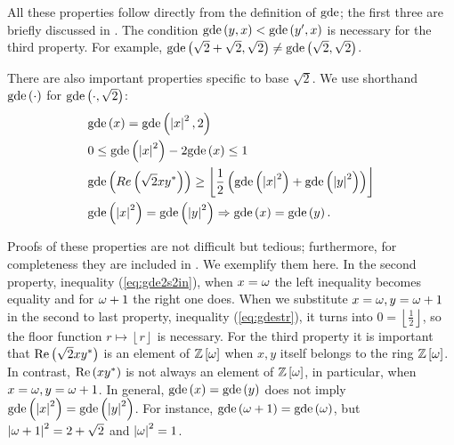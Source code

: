 \documentclass[english,journal]{extarticle}
\theoremstyle{plain}
\theoremstyle{plain}
\theoremstyle{plain}
\theoremstyle{definition}
\theoremstyle{plain}
\theoremstyle{plain}
\begin{document}
All these properties follow directly from the definition of $\mathbf{\mathrm{gde}}$;
the first three are briefly discussed in . The
condition
$\mathbf{\mathrm{gde}}\left(y,x\right)<\mathbf{\mathrm{gde}}\left(y',x\right)$ is necessary for the
third property. For example,
$\mathbf{\mathrm{gde}}\left(\sqrt{2}+\sqrt{2},\sqrt{2}\right)\ne\mathbf{\mathrm{gde}}\left(\sqrt{2},\sqrt{2}
\right)$. 

There are also important properties specific to base $\sqrt{2}$.
We use shorthand $\mathbf{\mathrm{gde}}\left(\cdot\right)$ for
$\mathbf{\mathrm{gde}}\left(\cdot,\sqrt{2}\right)$:
\begin{alignat}{1}
 & \mathbf{\mathrm{gde}}\left(x\right)=\mathbf{\mathrm{gde}}\left(\left|x\right|^{2},2\right)\label{eq:gde2s2}\\
 & 0\le\mathbf{\mathrm{gde}}\left(\left|x\right|^{2}\right)-2\mathbf{\mathrm{gde}}\left(x\right)\le 1\label{eq:gde2s2in}\\
 & \mathbf{\mathrm{gde}}\left(Re\left(\sqrt{2}xy^{*}\right)\right)\ge\left\lfloor
\frac{1}{2}\left(\mathbf{\mathrm{gde}}\left(\left|x\right|^{2}\right)+\mathbf{\mathrm{gde}}\left(\left|y\right|^{2}\right)\right)\right\rfloor \label{eq:gdestr}\\
 & \mathbf{\mathrm{gde}}\left(\left|x\right|^{2}\right)=\mathbf{\mathrm{gde}}\left(\left|y\right|^{2}\right)\Rightarrow\mathbf{\mathrm{gde}}\left(x\right)=\mathbf{\mathrm{gde}}\left(y\right)\label{eq:reduction}.
\end{alignat}

Proofs of these properties are not difficult but tedious; furthermore, for completeness they are included
in . We exemplify them here. In the second property,
inequality (\ref{eq:gde2s2in}), when $x=\omega$ the left inequality becomes
equality and for $\omega+1$ the right one does.  When we substitute $x=\omega,y=\omega+1$
in the second to last property, inequality (\ref{eq:gdestr}), it turns into $0=\left\lfloor
\frac{1}{2}\right\rfloor $,
so the floor function $r\mapsto\left\lfloor r\right\rfloor $
is necessary. For the third property it is important that
$\mathrm{Re}\left(\sqrt{2}xy^{*}\right)$
is an element of $\mathbb{Z}\left[\omega\right]$ when $x,y$ itself belongs to the ring $\mathbb{Z}\left[\omega\right]$.
In contrast, $\mathrm{Re}\left(xy^{*}\right)$ is not always an element of $\mathbb{Z}\left[\omega\right]$,
in particular, when $x=\omega,y=\omega+1$. In general,
$\mathbf{\mathrm{gde}}\left(x\right)=\mathbf{\mathrm{gde}}\left(y\right)$
does not imply $\mathbf{\mathrm{gde}}\left(\left|x\right|^{2}\right)=\mathbf{\mathrm{gde}}\left(\left|y\right|^{2}\right)$.
For instance, $\mathbf{\mathrm{gde}}\left(\omega+1\right)=\mathbf{\mathrm{gde}}\left(\omega\right)$, but
$\left|\omega+1\right|^{2}=2+\sqrt{2}$
and $\left|\omega\right|^{2}=1$.
\end{document}
